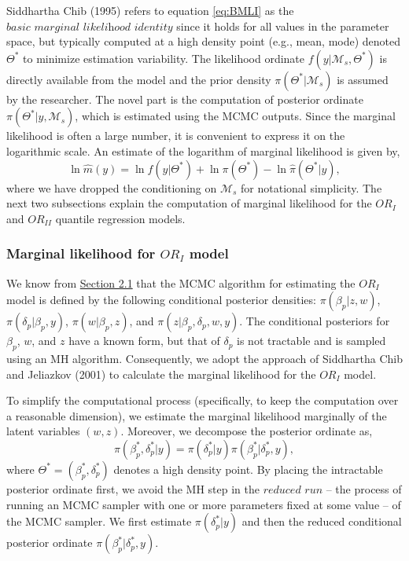 Siddhartha Chib (1995) refers to equation \eqref{eq:BMLI} as the \(\textit{basic marginal likelihood identity}\) since it holds for all values in the parameter space, but typically computed at a high density point (e.g., mean, mode) denoted \(\Theta^{\ast}\) to minimize estimation variability. The likelihood ordinate \(f(y|\mathcal{M}_{s},\Theta^{\ast})\) is directly available from the model and the prior density \(\pi(\Theta^{\ast}|\mathcal{M}_{s})\) is assumed by the researcher. The novel part is the computation of posterior ordinate \(\pi(\Theta^{\ast}|y, \mathcal{M}_{s})\), which is estimated using the MCMC outputs. Since the marginal likelihood is often a large number, it is convenient to express it on the logarithmic scale. An estimate of the logarithm of marginal likelihood is given by,
\begin{equation} 
\ln \hat{m}(y) = \ln f(y|\Theta^{\ast}) + \ln \pi(\Theta^{\ast}) - \ln \hat{\pi}(\Theta^{\ast}|y), \label{eq:logBMLI}
\end{equation}
where we have dropped the conditioning on \(\mathcal{M}_{s}\) for notational simplicity. The next two subsections explain the computation of marginal likelihood for the \(OR_{I}\) and \(OR_{II}\) quantile regression models.

\hypertarget{marginal-likelihood-for-or_i-model}{%
\subsubsection{\texorpdfstring{Marginal likelihood for \(OR_{I}\) model}{Marginal likelihood for OR\_\{I\} model}}\label{marginal-likelihood-for-or_i-model}}

We know from \protect\hyperlink{sec:ORI}{Section 2.1} that the MCMC algorithm for estimating the \(OR_{I}\) model is defined by the following conditional posterior densities: \(\pi(\beta_{p}|z,w)\), \(\pi(\delta_{p}|\beta_{p},y)\), \(\pi(w|\beta_{p},z)\), and \(\pi(z|\beta_{p},\delta_{p},w,y)\). The conditional posteriors for \(\beta_{p}\), \(w\), and \(z\) have a known form, but that of \(\delta_{p}\) is not tractable and is sampled using an MH algorithm. Consequently, we adopt the approach of Siddhartha Chib and Jeliazkov (2001) to calculate the marginal likelihood for the \(OR_{I}\) model.

To simplify the computational process (specifically, to keep the computation over a reasonable dimension), we estimate the marginal likelihood marginally of the latent variables \((w,z)\). Moreover, we decompose the posterior ordinate as,
\begin{equation*} 
\pi(\beta_{p}^{\ast}, \delta_{p}^{\ast}|y) = \pi(\delta_{p}^{\ast}|y) \pi(\beta_{p}^{\ast}| \delta_{p}^{\ast},y),
\end{equation*}
where \(\Theta^{\ast} = (\beta_{p}^{\ast}, \delta_{p}^{\ast})\) denotes a high density point. By placing the intractable posterior ordinate first, we avoid the MH step in the \(\textit{reduced run}\) -- the process of running an MCMC sampler with one or more parameters fixed at some value -- of the MCMC sampler. We first estimate \(\pi(\delta_{p}^{\ast}|y)\) and then the reduced conditional posterior ordinate \(\pi(\beta_{p}^{\ast}| \delta_{p}^{\ast},y)\).

